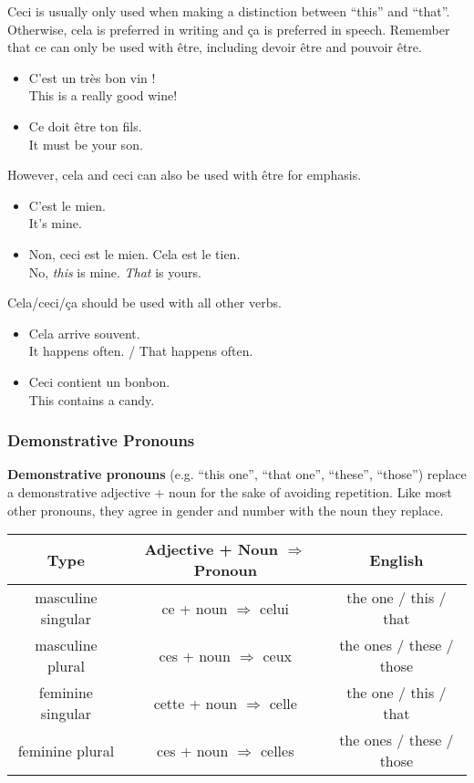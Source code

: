 Ceci is usually only used when making a distinction between ``this'' and ``that''. Otherwise, cela is preferred in writing and {\c c}a is preferred in speech.  Remember that ce can only be used with {\^e}tre, including devoir {\^e}tre and pouvoir {\^e}tre.

\begin{itemize}
  \item  C'est un tr{\`e}s bon vin ! \\ This is a really good wine!
  \item  Ce doit {\^e}tre ton fils. \\ It must be your son. 
\end{itemize}

However, cela and ceci can also be used with {\^e}tre for emphasis.

\begin{itemize}
  \item  C'est le mien. \\ It's mine.
  \item  Non, ceci est le mien. Cela est le tien. \\ No, \textit{this} is mine. \textit{That} is yours.
\end{itemize}

Cela/ceci/{\c c}a should be used with all other verbs.

\begin{itemize}
  \item  Cela arrive souvent. \\ It happens often. / That happens often.
  \item  Ceci contient un bonbon. \\ This contains a candy.
\end{itemize}

\subsubsection{Demonstrative Pronouns}

\textbf{Demonstrative pronouns} (e.g. ``this one'', ``that one'', ``these'', ``those'') replace a demonstrative adjective + noun for the sake of avoiding repetition. Like most other pronouns, they agree in gender and number with the noun they replace.

\begin{center}\begin{tabular}{|c|c|c|}
\hline
\textbf{Type}      & \textbf{Adjective + Noun $\Rightarrow$ Pronoun} & \textbf{English}         \\ \hline
masculine singular & ce + noun $\Rightarrow$ celui                   & the one / this / that    \\ \hline
masculine plural   & ces + noun $\Rightarrow$ ceux                   & the ones / these / those \\ \hline
feminine singular  & cette + noun $\Rightarrow$ celle                & the one / this / that    \\ \hline
feminine plural    & ces + noun $\Rightarrow$ celles                 & the ones / these / those \\ \hline
\end{tabular}\end{center}

